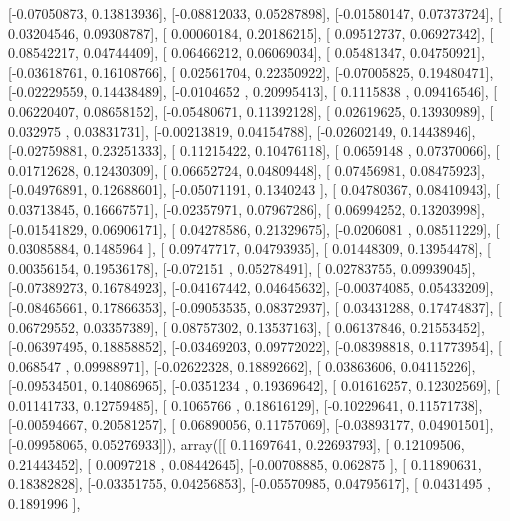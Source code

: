 \documentclass{article}
\begin{document}
       [-0.07050873,  0.13813936],
       [-0.08812033,  0.05287898],
       [-0.01580147,  0.07373724],
       [ 0.03204546,  0.09308787],
       [ 0.00060184,  0.20186215],
       [ 0.09512737,  0.06927342],
       [ 0.08542217,  0.04744409],
       [ 0.06466212,  0.06069034],
       [ 0.05481347,  0.04750921],
       [-0.03618761,  0.16108766],
       [ 0.02561704,  0.22350922],
       [-0.07005825,  0.19480471],
       [-0.02229559,  0.14438489],
       [-0.0104652 ,  0.20995413],
       [ 0.1115838 ,  0.09416546],
       [ 0.06220407,  0.08658152],
       [-0.05480671,  0.11392128],
       [ 0.02619625,  0.13930989],
       [ 0.032975  ,  0.03831731],
       [-0.00213819,  0.04154788],
       [-0.02602149,  0.14438946],
       [-0.02759881,  0.23251333],
       [ 0.11215422,  0.10476118],
       [ 0.0659148 ,  0.07370066],
       [ 0.01712628,  0.12430309],
       [ 0.06652724,  0.04809448],
       [ 0.07456981,  0.08475923],
       [-0.04976891,  0.12688601],
       [-0.05071191,  0.1340243 ],
       [ 0.04780367,  0.08410943],
       [ 0.03713845,  0.16667571],
       [-0.02357971,  0.07967286],
       [ 0.06994252,  0.13203998],
       [-0.01541829,  0.06906171],
       [ 0.04278586,  0.21329675],
       [-0.0206081 ,  0.08511229],
       [ 0.03085884,  0.1485964 ],
       [ 0.09747717,  0.04793935],
       [ 0.01448309,  0.13954478],
       [ 0.00356154,  0.19536178],
       [-0.072151  ,  0.05278491],
       [ 0.02783755,  0.09939045],
       [-0.07389273,  0.16784923],
       [-0.04167442,  0.04645632],
       [-0.00374085,  0.05433209],
       [-0.08465661,  0.17866353],
       [-0.09053535,  0.08372937],
       [ 0.03431288,  0.17474837],
       [ 0.06729552,  0.03357389],
       [ 0.08757302,  0.13537163],
       [ 0.06137846,  0.21553452],
       [-0.06397495,  0.18858852],
       [-0.03469203,  0.09772022],
       [-0.08398818,  0.11773954],
       [ 0.068547  ,  0.09988971],
       [-0.02622328,  0.18892662],
       [ 0.03863606,  0.04115226],
       [-0.09534501,  0.14086965],
       [-0.0351234 ,  0.19369642],
       [ 0.01616257,  0.12302569],
       [ 0.01141733,  0.12759485],
       [ 0.1065766 ,  0.18616129],
       [-0.10229641,  0.11571738],
       [-0.00594667,  0.20581257],
       [ 0.06890056,  0.11757069],
       [-0.03893177,  0.04901501],
       [-0.09958065,  0.05276933]]), array([[ 0.11697641,  0.22693793],
       [ 0.12109506,  0.21443452],
       [ 0.0097218 ,  0.08442645],
       [-0.00708885,  0.062875  ],
       [ 0.11890631,  0.18382828],
       [-0.03351755,  0.04256853],
       [-0.05570985,  0.04795617],
       [ 0.0431495 ,  0.1891996 ],
\end{document}
